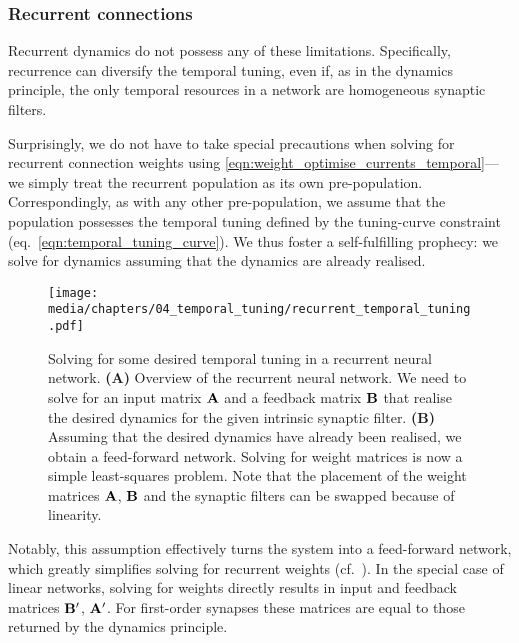 \subsubsection{Recurrent connections}

Recurrent dynamics do not possess any of these limitations.
Specifically, recurrence can diversify the temporal tuning, even if, as in the \NEF dynamics principle, the only temporal resources in a network are homogeneous synaptic filters.

Surprisingly, we do not have to take special precautions when solving for recurrent connection weights using \cref{eqn:weight_optimise_currents_temporal}---we simply treat the recurrent population as its own pre-population.
Correspondingly, as with any other pre-population, we assume that the population possesses the temporal tuning defined by the tuning-curve constraint (eq.~\ref{eqn:temporal_tuning_curve}).
We thus foster a self-fulfilling prophecy: we solve for dynamics assuming that the dynamics are already realised.

\begin{figure}
	\centering
	\texttt{[image: media/chapters/04\_temporal\_tuning/recurrent\_temporal\_tuning.pdf]}
	\caption[Solving for some desired temporal tuning in a recurrent neural network]{Solving for some desired temporal tuning in a recurrent neural network. \textbf{(A)} Overview of the recurrent neural network. We need to solve for an input matrix $\mathbf{A}$ and a feedback matrix $\mathbf{B}$ that realise the desired dynamics for the given intrinsic synaptic filter.
	\textbf{(B)} Assuming that the desired dynamics have already been realised, we obtain a feed-forward network.
	Solving for weight matrices is now a simple least-squares problem.
	Note that the placement of the weight matrices $\mathbf{A}$, $\mathbf{B}$ and the synaptic filters can be swapped because of linearity.
	}
	\label{fig:recurrent_temporal_tuning}
\end{figure}

Notably, this assumption effectively turns the system into a feed-forward network, which greatly simplifies solving for recurrent weights (cf.~).
In the special case of linear networks, solving for weights directly results in input and feedback matrices $\mathbf{B}'$, $\mathbf{A}'$.
For first-order synapses these matrices are equal to those returned by the \NEF dynamics principle.

